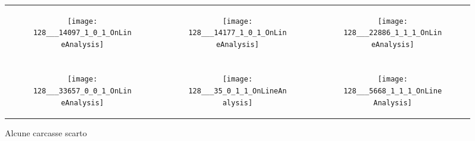 \begin{figure}[ht] %
  \begin{center}
    \begin{tabular}{ccc}

  \begin{subfigure}{.3\linewidth}
    \centering\texttt{[image: 128\_\_\_14097\_1\_0\_1\_OnLineAnalysis]}
    \caption{}
  \end{subfigure} &

  \begin{subfigure}{.3\linewidth}
      \texttt{[image: 128\_\_\_14177\_1\_0\_1\_OnLineAnalysis]}
      \caption{}
      \label{fig:esempi_scarti_sbaffo}
    \end{subfigure} &

  \begin{subfigure}{.3\linewidth}
      \texttt{[image: 128\_\_\_22886\_1\_1\_1\_OnLineAnalysis]}
      \caption{}
    \end{subfigure} \\ \\

  \begin{subfigure}{.3\linewidth}
      \texttt{[image: 128\_\_\_33657\_0\_0\_1\_OnLineAnalysis]}
      \caption{}
      \label{fig:esempi_scarti_goccia}
    \end{subfigure} &

  \begin{subfigure}{.3\linewidth}
      \texttt{[image: 128\_\_\_35\_0\_1\_1\_OnLineAnalysis]}
      \caption{}
    \end{subfigure} &

    \begin{subfigure}{.3\linewidth}
      \texttt{[image: 128\_\_\_5668\_1\_1\_1\_OnLineAnalysis]}
      \caption{}
    \end{subfigure} \\

    \end{tabular}
    \caption{Alcune carcasse scarto}
    \label{fig:esempi_scarti}
  \end{center}
\end{figure}


